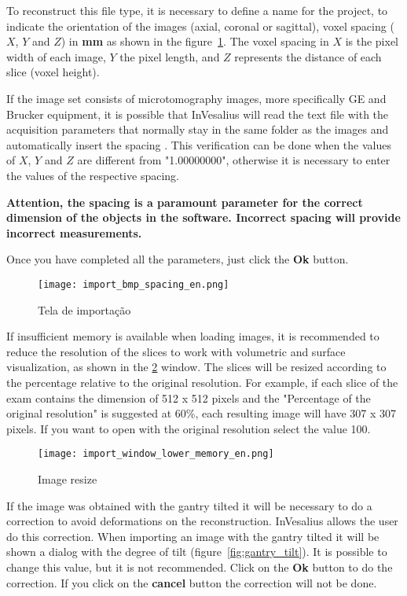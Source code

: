 To reconstruct this file type, it is necessary to define a name for the project, to indicate the orientation of the images (axial, coronal or sagittal), voxel spacing ($X$, $Y$ and $Z$) in \textbf{mm} as shown in the figure~\ref{fig:import_bmp_spacing_pt}. The voxel spacing in $X$ is the pixel width of each image, $Y$ the pixel length, and $Z$ represents the distance of each slice (voxel height).

If the image set consists of microtomography images, more specifically GE and Brucker equipment, it is possible that InVesalius will read the text file with the acquisition parameters that normally stay in the same folder as the images and automatically insert the spacing . This verification can be done when the values of $X$, $Y$ and $Z$ are different from "1.00000000", otherwise it is necessary to enter the values of the respective spacing.

\textbf{Attention, the spacing is a paramount parameter for the correct dimension of the objects in the software. Incorrect spacing will provide incorrect measurements.}

Once you have completed all the parameters, just click the \textbf{Ok} button.

\begin{figure}[!htb]
\centering
\texttt{[image: import\_bmp\_spacing\_en.png]}
\caption{Tela de importação}
\label{fig:import_bmp_spacing_pt}
\end{figure}

If insufficient memory is available when loading images, it is recommended to reduce the resolution of the slices to work with volumetric and surface visualization, as shown in the \ref{fig:import_bmp_resize_pt} window. The slices will be resized according to the percentage relative to the original resolution. For example, if each slice of the exam contains the dimension of 512 x 512 pixels and the "Percentage of the original resolution" is suggested at 60\%, each resulting image will have 307 x 307 pixels. If you want to open with the original resolution select the value 100.

\begin{figure}[!htb]
\centering
\texttt{[image: import\_window\_lower\_memory\_en.png]}
\caption{Image resize}
\label{fig:import_bmp_resize_pt}
\end{figure}

If the image was obtained with the gantry tilted it will be necessary to do a correction to avoid deformations on the reconstruction. InVesalius allows the user do this correction. When importing an image with the gantry tilted it will be shown a dialog with the degree of tilt (figure~\ref{fig:gantry_tilt}). It is possible to change this value, but it is not recommended. Click on the \textbf{Ok} button to do the correction. If you click on the \textbf{cancel} button the correction will not be done.

